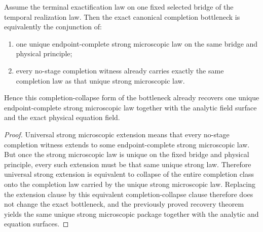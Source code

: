\begin{theorem}
\label{thm:canonical-completion-bottleneck-iff-canonical-strong-microscopic-law-plus-universal-completion-collapse}
Assume the terminal exactification law on one fixed selected bridge of the
temporal realization law. Then the exact canonical completion bottleneck is
equivalently the conjunction of:
\begin{enumerate}
\item one unique endpoint-complete strong microscopic law on the same bridge
and physical principle;
\item every no-stage completion witness already carries exactly the
      same completion law as that unique strong microscopic law.
\end{enumerate}
Hence this completion-collapse form of the bottleneck already recovers one
unique endpoint-complete strong microscopic law together with the analytic
field surface and the exact physical equation field.
\end{theorem}

\begin{proof}
Universal strong microscopic extension means that every no-stage
completion witness extends to some endpoint-complete strong microscopic law.
But once the strong microscopic law is unique on the fixed bridge and physical
principle, every such extension must be that same unique strong law.
Therefore universal strong extension is equivalent to collapse of the entire
completion class onto the completion law carried by the unique
strong microscopic law. Replacing the extension clause by this equivalent
completion-collapse clause therefore does not change the exact bottleneck, and
the previously proved recovery theorem yields the same unique strong
microscopic package together with the analytic and equation surfaces.
\end{proof}

